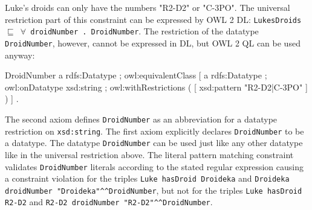 \documentclass{llncs}
\newcommand{\ms}[1]{\texttt{#1}}
\begin{document}
%
%

Luke's droids can only have the numbers "R2-D2" or "C-3PO".
The universal restriction part of this constraint can be expressed by OWL 2 DL:
\ms{LukesDroids $\sqsubseteq$ $\forall$ droidNumber . DroidNumber}.
The restriction of the datatype \ms{DroidNumber}, however, cannot be expressed in DL, but OWL 2 QL can be used anyway:

\begin{ex}
DroidNumber 
    a rdfs:Datatype ;
    owl:equivalentClass [
        a rdfs:Datatype ;
        owl:onDatatype xsd:string ;
        owl:withRestrictions ( 
            [ xsd:pattern "R2-D2|C-3PO" ] ) ] .
\end{ex}

The second axiom defines \ms{DroidNumber} as an abbreviation for a datatype restriction on \ms{xsd:string}. 
The first axiom explicitly declares \ms{DroidNumber} to be a datatype. 
The datatype \ms{DroidNumber} can be used just like any other datatype like in the universal restriction above.
The literal pattern matching constraint validates \ms{DroidNumber} literals according to the stated regular expression causing a constraint violation for the triples 
\ms{Luke hasDroid Droideka} and \ms{Droideka droidNumber "Droideka"\textasciicircum{}\textasciicircum{}DroidNumber}, 
but not for the triples \ms{Luke hasDroid R2-D2} and \ms{R2-D2 droidNumber "R2-D2"\textasciicircum{}\textasciicircum{}DroidNumber}.
\end{document}
